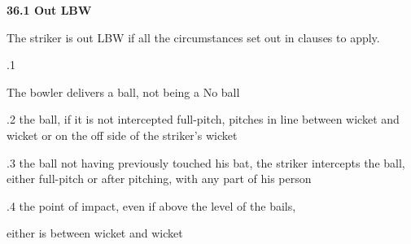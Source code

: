 \documentclass[12pt]{article}
\begin{document}
\vspace{\baselineskip}
{\fontsize{11pt}{13.2pt}\selectfont \textbf{36.1 \tabto{0.47in} Out LBW}\par}\par


\vspace{\baselineskip}
{\fontsize{9pt}{10.8pt}\selectfont The striker is out LBW if all the circumstances set out in clauses to apply.\par}\par


\vspace{\baselineskip}
{\fontsize{9pt}{10.8pt}.1 \tabto{0.49in} {\fontsize{8pt}{9.6pt}\selectfont The bowler delivers a ball, not being a No ball\par}\par}\par


\vspace{\baselineskip}
\begin{adjustwidth}{0.5in}{0.22in}
{\fontsize{9pt}{10.8pt}.2 \tabto{0.49in} the ball, if it is not intercepted full-pitch, pitches in line between wicket and wicket or on the off side of the striker’s wicket\par}\par

\end{adjustwidth}


\vspace{\baselineskip}
\begin{adjustwidth}{0.5in}{0.06in}
{\fontsize{9pt}{10.8pt}.3 \tabto{0.49in} the ball not having previously touched his bat, the striker intercepts the ball, either full-pitch or after pitching, with any part of his person\par}\par

\end{adjustwidth}


\vspace{\baselineskip}
{\fontsize{9pt}{10.8pt}.4 \tabto{0.49in} the point of impact, even if above the level of the bails,\par}\par


\vspace{\baselineskip}
\begin{adjustwidth}{0.5in}{0.0in}
{\fontsize{9pt}{10.8pt}\selectfont either is between wicket and wicket\par}\par

\end{adjustwidth}
\end{document}
